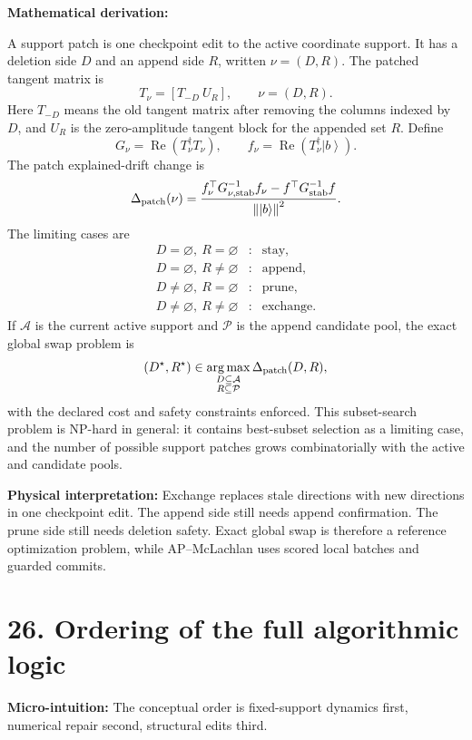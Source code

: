\documentclass[10pt,twocolumn]{article}
\newcommand{\ket}[1]{\left|#1\right\rangle}
\newcommand{\norm}[1]{\left\lVert #1\right\rVert}
\newcommand{\argmax}{\operatorname*{arg\,max}}
\newcommand{\Real}{\operatorname{Re}}
\newcommand{\micro}[1]{%
  \par\smallskip
  \noindent\textcolor{deepblue}{\textbf{Micro-intuition:}} #1
  \par\smallskip}
\newcommand{\deriv}{%
  \par\noindent\textcolor{deepviolet}{\textbf{Mathematical derivation:}}\par\vspace{-1mm}}
\newcommand{\phys}[1]{%
  \par\smallskip
  \noindent\textcolor{deepgreen}{\textbf{Physical interpretation:}} #1
  \par\smallskip}
\begin{document}
\deriv
A support patch is one checkpoint edit to the active coordinate support. It has
a deletion side \(D\) and an append side \(R\), written
\(\nu=(D,R)\). The patched tangent matrix is
\[
T_\nu=[T_{-D}~U_R],
\qquad
\nu=(D,R).
\]
Here \(T_{-D}\) means the old tangent matrix after removing the columns indexed
by \(D\), and \(U_R\) is the zero-amplitude tangent block for the appended set
\(R\).
Define
\[
G_\nu=\Real(T_\nu^\dagger T_\nu),
\qquad
f_\nu=\Real(T_\nu^\dagger\ket b).
\]
The patch explained-drift change is
\[
\Delta_{\rm patch}(\nu)
=
\frac{
f_\nu^\top G_{\nu,{\rm stab}}^{-1}f_\nu
-f^\top G_{\rm stab}^{-1}f
}{\norm{\ket b}^2}.
\]
The limiting cases are
\[
\begin{array}{ccl}
D=\varnothing,\ R=\varnothing &:& \text{stay},\\
D=\varnothing,\ R\ne\varnothing &:& \text{append},\\
D\ne\varnothing,\ R=\varnothing &:& \text{prune},\\
D\ne\varnothing,\ R\ne\varnothing &:& \text{exchange}.
\end{array}
\]
If \(\mathcal A\) is the current active support and \(\mathcal P\) is the append
candidate pool, the exact global swap problem is
\[
(D^\star,R^\star)
\in
\argmax_{\substack{D\subseteq\mathcal A\\ R\subseteq\mathcal P}}
\Delta_{\rm patch}(D,R),
\]
with the declared cost and safety constraints enforced.
This subset-search problem is NP-hard in general: it contains best-subset
selection as a limiting case, and the number of possible support patches grows
combinatorially with the active and candidate pools.

\phys{Exchange replaces stale directions with new directions in one checkpoint
edit. The append side still needs append confirmation. The prune side still
needs deletion safety. Exact global swap is therefore a reference optimization
problem, while AP--McLachlan uses scored local batches and guarded commits.}

\section*{26. Ordering of the full algorithmic logic}

\micro{The conceptual order is fixed-support dynamics first, numerical repair
second, structural edits third.}
\end{document}
